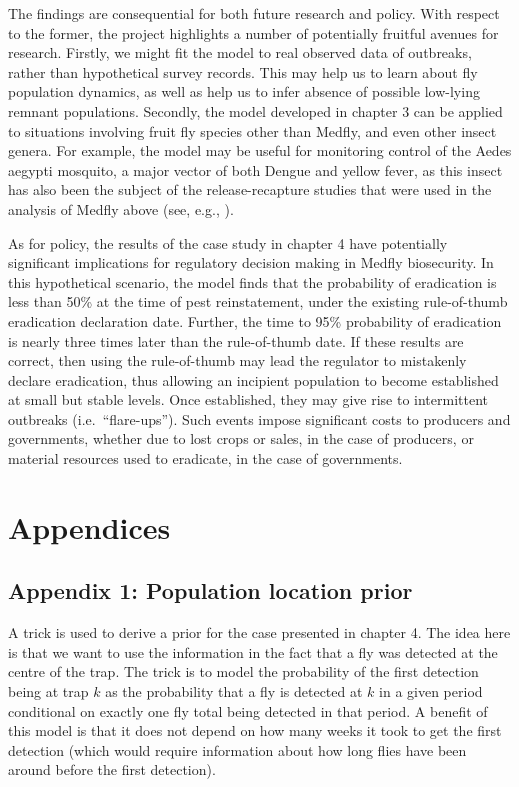 \documentclass[
  oneside]{book}
\begin{document}
The findings are consequential for both future research and policy. With respect to the former, the project highlights a number of potentially fruitful avenues for research. Firstly, we might fit the model to real observed data of outbreaks, rather than hypothetical survey records. This may help us to learn about fly population dynamics, as well as help us to infer absence of possible low-lying remnant populations. Secondly, the model developed in chapter 3 can be applied to situations involving fruit fly species other than Medfly, and even other insect genera. For example, the model may be useful for monitoring control of the Aedes aegypti mosquito, a major vector of both Dengue and yellow fever, as this insect has also been the subject of the release-recapture studies that were used in the analysis of Medfly above (see, e.g., \citet{russell2005mark}).

As for policy, the results of the case study in chapter 4 have potentially significant implications for regulatory decision making in Medfly biosecurity. In this hypothetical scenario, the model finds that the probability of eradication is less than 50\% at the time of pest reinstatement, under the existing rule-of-thumb eradication declaration date. Further, the time to 95\% probability of eradication is nearly three times later than the rule-of-thumb date. If these results are correct, then using the rule-of-thumb may lead the regulator to mistakenly declare eradication, thus allowing an incipient population to become established at small but stable levels. Once established, they may give rise to intermittent outbreaks (i.e.~``flare-ups''). Such events impose significant costs to producers and governments, whether due to lost crops or sales, in the case of producers, or material resources used to eradicate, in the case of governments.

\hypertarget{appendices}{%
\chapter{Appendices}\label{appendices}}

\hypertarget{appendix-1-population-location-prior}{%
\section{Appendix 1: Population location prior}\label{appendix-1-population-location-prior}}

A trick is used to derive a prior for the case presented in chapter 4. The idea here is that we want to use the information in the fact that a fly was detected at the centre of the trap. The trick is to model the probability of the first detection being at trap \(k\) as the probability that a fly is detected at \(k\) in a given period conditional on exactly one fly total being detected in that period. A benefit of this model is that it does not depend on how many weeks it took to get the first detection (which would require information about how long flies have been around before the first detection).
\end{document}

